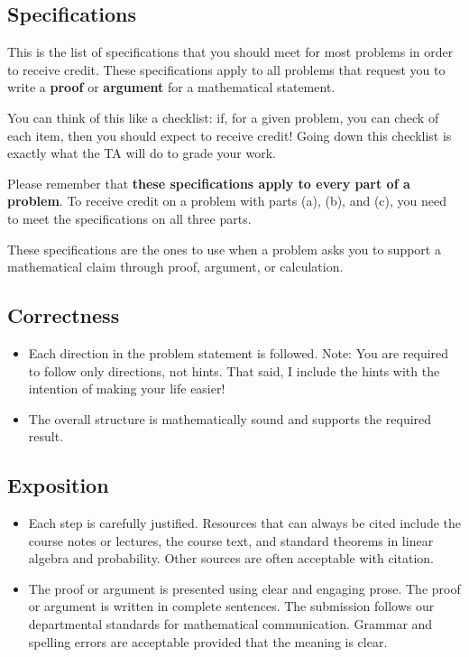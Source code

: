 \documentclass[11pt]{article}
\begin{document}
\begin{titlepage}
\subsection*{Specifications}

This is the list of specifications that you should meet for most problems in order to receive credit. 
These specifications apply to all problems that request you to write a \textbf{proof} or \textbf{argument} for a mathematical statement. 

You can think of this like a checklist: if, for a given problem, you can check of each item, then you should expect to receive credit! 
Going down this checklist is exactly what the TA will do to grade your work. 

Please remember that \textbf{these specifications apply to every part of a problem}. 
To receive credit on a problem with parts (a), (b), and (c), you need to meet the specifications on all three parts.  

These specifications are the ones to use when a problem asks you to support a mathematical claim through proof, argument, or calculation.

\subsection*{Correctness}
\begin{itemize}
    \item Each direction in the problem statement is followed.
        Note: You are required to follow only directions, not hints. That said, I include the hints with the intention of making your life easier!
    \item The overall structure is mathematically sound and supports the required result.
\end{itemize}

\subsection*{Exposition}
\begin{itemize}
    \item Each step is carefully justified. Resources that can always be cited include the course notes or lectures, the course text, and standard theorems in linear algebra and probability. Other sources are often acceptable with citation.
    \item The proof or argument is presented using clear and engaging prose. The proof or argument is written in complete sentences. The submission follows our departmental standards for mathematical communication. Grammar and spelling errors are acceptable provided that the meaning is clear.
\end{itemize}


\end{titlepage}
\end{document}
